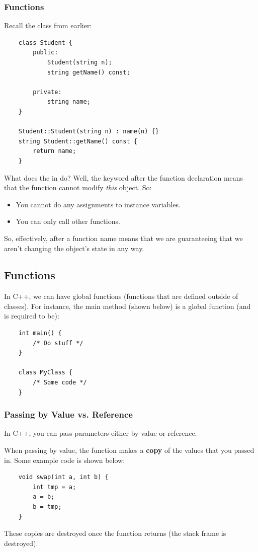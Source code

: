 \documentclass[letterpaper]{article}
\begin{document}
\subsubsection{ Functions}
Recall the  class from earlier: 
\begin{verbatim}
    class Student {
        public: 
            Student(string n);
            string getName() const; 
            
        private: 
            string name; 
    }

    Student::Student(string n) : name(n) {}
    string Student::getName() const {
        return name;
    }
\end{verbatim}
What does the  in  do? Well, the  keyword after the function declaration means that the function cannot modify \emph{this} object. So: 
\begin{itemize}
    \item You cannot do any assignments to instance variables. 
    \item You can only call other  functions.
\end{itemize} 
So, effectively,  after a function name means that we are guaranteeing that we aren't changing the object's state in any way.

\subsection{Functions}
In C++, we can have global functions (functions that are defined outside of classes). For instance, the main method (shown below) is a global function (and is required to be):
\begin{verbatim}
    int main() {
        /* Do stuff */ 
    }

    class MyClass {
        /* Some code */ 
    }
\end{verbatim}

\subsubsection{Passing by Value vs. Reference}
In C++, you can pass parameters either by value or reference. 

\bigskip

When passing by value, the function makes a \textbf{copy} of the values that you passed in. Some example code is shown below:
\begin{verbatim}
    void swap(int a, int b) {
        int tmp = a;
        a = b;
        b = tmp;
    }
\end{verbatim}
These copies are destroyed once the function returns (the stack frame is destroyed). 
\end{document}
